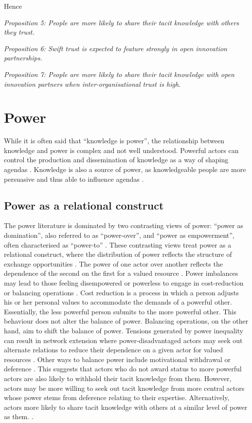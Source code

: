 Hence 

\emph{Proposition 5: People are more likely to share their tacit knowledge with others they trust.}

\emph{Proposition 6: Swift trust is expected to feature strongly in open innovation partnerships.}

\emph{Proposition 7: People are more likely to share their tacit knowledge with open innovation partners when inter-organisational trust is high}.

\section{Power}

 While it is often said that \enquote{knowledge is power}, the relationship between knowledge and power is complex and not well understood. Powerful actors can control the production and dissemination of knowledge as a way of shaping agendas \citep{gaventa2007power}. Knowledge is also a source of power, as knowledgeable people are more persuasive and thus able to influence agendas \citep{hart1997power}. \medskip
 
\subsection{Power as a relational construct}

The power literature is dominated by two contrasting views of power: \enquote{power as domination}, also referred to as \enquote{power-over}, and \enquote{power as empowerment}, often characterised as \enquote{power-to} \citep{haugaard2012rethinking}. These contrasting views treat power as a relational construct, where the distribution of power reflects the structure of exchange opportunities \citep{blau1964exchange,reagans2008knowledge,bonacich2009structural}. The power of one actor over another reflects the dependence of the second on the first for a valued resource \citep{emerson1962power}. Power imbalances may lead to those feeling disempowered or powerless to engage in cost-reduction or balancing operations \citep{emerson1962power}. Cost reduction is a process in which a person adjusts his or her personal values to accommodate the demands of a powerful other. Essentially, the less powerful person submits to the more powerful other. This behaviour does not alter the balance of power. Balancing operations, on the other hand, aim to shift the balance of power. Tensions generated by power inequality can result in network extension where power-disadvantaged actors may seek out alternate relations to reduce their dependence on a given actor for valued resources \citep{cook2013social}. Other ways to balance power include motivational withdrawal or deference \citep{emerson1962power}. This suggests that actors who do not award status to more powerful actors are also likely to withhold their tacit knowledge from them. However, actors may be more willing to seek out tacit knowledge from more central actors whose power stems from deference relating to their expertise. Alternatively, actors more likely to share tacit knowledge with others at a similar level of power as them. \medskip.


